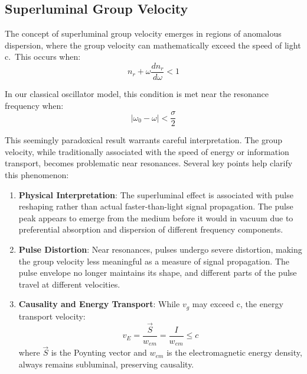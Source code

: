 \documentclass[
  a4paper,
]{book}
\begin{document}
\subsection{Superluminal Group
Velocity}\label{superluminal-group-velocity}

The concept of superluminal group velocity emerges in regions of
anomalous dispersion, where the group velocity can mathematically exceed
the speed of light c.~This occurs when: \[
n_r+\omega \frac{dn_r}{d\omega}<1
\]

In our classical oscillator model, this condition is met near the
resonance frequency when: \[
|\omega_0-\omega|<\frac{\sigma}{2}
\]

This seemingly paradoxical result warrants careful interpretation. The
group velocity, while traditionally associated with the speed of energy
or information transport, becomes problematic near resonances. Several
key points help clarify this phenomenon:

\begin{enumerate}
\def\labelenumi{\arabic{enumi}.}
\item
  \textbf{Physical Interpretation}: The superluminal effect is
  associated with pulse reshaping rather than actual faster-than-light
  signal propagation. The pulse peak appears to emerge from the medium
  before it would in vacuum due to preferential absorption and
  dispersion of different frequency components.
\item
  \textbf{Pulse Distortion}: Near resonances, pulses undergo severe
  distortion, making the group velocity less meaningful as a measure of
  signal propagation. The pulse envelope no longer maintains its shape,
  and different parts of the pulse travel at different velocities.
\item
  \textbf{Causality and Energy Transport}: While \(v_g\) may exceed c,
  the energy transport velocity: \[
  v_{E}=\frac{\vec{S}}{w_{em}}=\frac{I}{w_{em}}\le c
  \] where \(\vec{S}\) is the Poynting vector and \(w_{em}\) is the
  electromagnetic energy density, always remains subluminal, preserving
  causality.
\end{enumerate}
\end{document}
